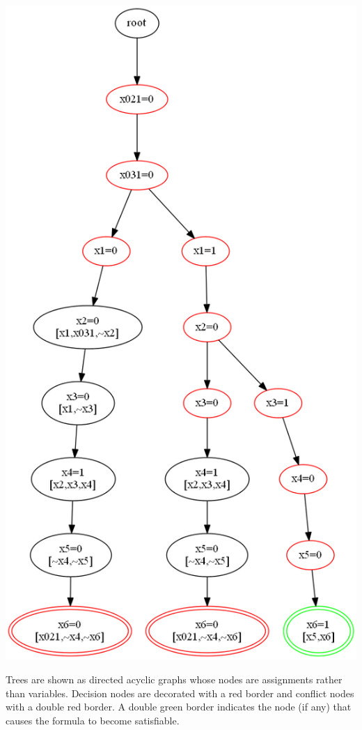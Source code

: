 \documentclass[11pt]{article}
\begin{document}
\begin{center}
\includegraphics[keepaspectratio=true,height=.7\textheight]{tree1}

\end{center}

Trees are shown as directed acyclic graphs whose nodes are assignments
rather than variables. Decision nodes are decorated with a red border
and conflict nodes with a double red border. A double green border
indicates the node (if any) that causes the formula to become
satisfiable.
\end{document}
